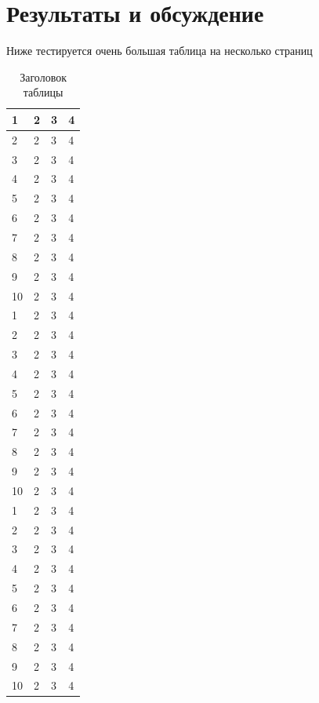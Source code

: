 \documentclass[a4paper,14pt]{extarticle}
\begin{document}
\pagebreak
\section{Результаты и обсуждение}

Ниже тестируется очень большая таблица на несколько страниц

\begin{center}
    \begin{longtable}{|p{2cm}|p{3cm}|p{7cm}|p{3cm}|}
    \caption{Заголовок таблицы}\\
    \hline
    1 & 2 & 3 & 4\\ 
    \hline 
    2 & 2 & 3 & 4\\
    \hline
    3 & 2 & 3 & 4\\
    \hline
    4 & 2 & 3 & 4\\
    \hline
    5 & 2 & 3 & 4\\
    \hline
    6 & 2 & 3 & 4\\
    \hline
    7 & 2 & 3 & 4\\
    \hline
    8 & 2 & 3 & 4\\
    \hline
    9 & 2 & 3 & 4\\
    \hline
    10 & 2 & 3 & 4\\
    \hline
    1 & 2 & 3 & 4\\ 
    \hline 
    2 & 2 & 3 & 4\\
    \hline
    3 & 2 & 3 & 4\\
    \hline
    4 & 2 & 3 & 4\\
    \hline
    5 & 2 & 3 & 4\\
    \hline
    6 & 2 & 3 & 4\\
    \hline
    7 & 2 & 3 & 4\\
    \hline
    8 & 2 & 3 & 4\\
    \hline
    9 & 2 & 3 & 4\\
    \hline
    10 & 2 & 3 & 4\\
    \hline
    1 & 2 & 3 & 4\\ 
    \hline 
    2 & 2 & 3 & 4\\
    \hline
    3 & 2 & 3 & 4\\
    \hline
    4 & 2 & 3 & 4\\
    \hline
    5 & 2 & 3 & 4\\
    \hline
    6 & 2 & 3 & 4\\
    \hline
    7 & 2 & 3 & 4\\
    \hline
    8 & 2 & 3 & 4\\
    \hline
    9 & 2 & 3 & 4\\
    \hline
    10 & 2 & 3 & 4\\
    \hline
    
    
    \end{longtable}
\end{center}
\end{document}
